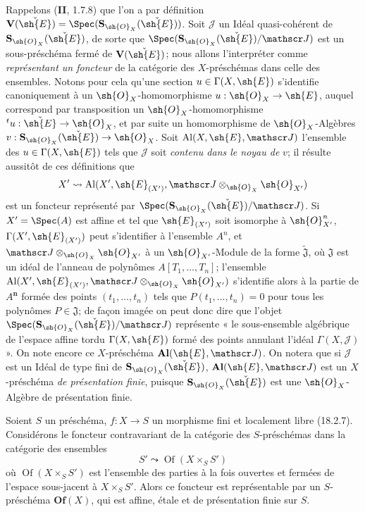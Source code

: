 \begin{env}[18.5.2]
\label{IV.18.5.2}
Rappelons (\textbf{II}, 1.7.8) que l'on a par définition $\mathbf V(\check{\sh{E}})=\Spec(\mathbf S_{\sh{O}_X}(\check{\sh{E}}))$. Soit $\mathscr J$ un Idéal quasi-cohérent de $\mathbf S_{\sh{O}_X}(\check{\sh{E}})$, de sorte que $\Spec(\mathbf S_{\sh{O}_X}(\check{\sh{E}})/\mathscr J)$ est un sous-préschéma fermé de $\mathbf V(\check{\sh{E}})$; nous allons l'interpréter comme \emph{représentant un foncteur} de la catégorie des $X$-préschémas dans celle des ensembles. Notons pour cela qu'une section $u\in\Gamma(X,\sh{E})$ s'identifie canoniquement à un $\sh{O}_X$-homomorphisme $u:\sh{O}_X\to\sh{E}$, auquel correspond par transposition un $\sh{O}_X$-homomorphisme ${}^t u:\check{\sh{E}}\to\sh{O}_X$, et par suite un homomorphisme de $\sh{O}_X$-Algèbres $v:\mathbf S_{\sh{O}_X}(\check{\sh{E}})\to\sh{O}_X$. Soit $\operatorname{Al}(X,\sh{E},\mathscr J)$ l'ensemble des $u\in\Gamma(X,\sh{E})$ tels que $\mathscr J$ soit \emph{contenu dans le noyau de} $v$; il résulte aussitôt de ces définitions que
\[
  X'\leadsto\operatorname{Al}(X',\sh{E}_{(X')},\mathscr J\otimes_{\sh{O}_X}\sh{O}_{X'})
\]
est un foncteur représenté par $\Spec(\mathbf S_{\sh{O}_X}(\check{\sh{E}})/\mathscr J)$. Si $X'=\Spec(A)$ est affine et tel que $\sh{E}_{(X')}$ soit isomorphe à $\sh{O}_{X'}^n$, $\Gamma(X',\sh{E}_{(X')})$ peut s'identifier à l'ensemble $A^n$, et $\mathscr J\otimes_{\sh{O}_X}\sh{O}_{X'}$ à un $\sh{O}_{X'}$-Module de la forme $\widetilde{\mathfrak J}$, où $\mathfrak J$ est un idéal de l'anneau de polynômes $A[T_1,\ldots,T_n]$; l'ensemble $\operatorname{Al}(X',\sh{E}_{(X')},\mathscr J\otimes_{\sh{O}_X}\sh{O}_{X'})$ s'identifie alors à la partie de $A^{\boldsymbol{n}}$ formée des points $(t_1,\ldots,t_n)$ tels que $P(t_1,\ldots,t_n)=0$ pour tous les polynômes $P\in\mathfrak J$; de façon imagée on peut donc dire que l'objet $\Spec(\mathbf S_{\sh{O}_X}(\check{\sh{E}})/\mathscr J)$ représente « le sous-ensemble algébrique de l'espace affine tordu $\Gamma(X,\sh{E})$ formé des points annulant l'idéal $\Gamma(X,\mathscr J)$ ». On note encore ce $X$-préschéma $\mathbf{Al}(\sh{E},\mathscr J)$. On notera que si $\mathscr J$ est un Idéal de type fini de $\mathbf S_{\sh{O}_X}(\check{\sh{E}})$, $\mathbf{Al}(\sh{E},\mathscr J)$ est un $X$-préschéma \emph{de présentation finie}, puisque $\mathbf S_{\sh{O}_X}(\check{\sh{E}})$ est une $\sh{O}_X$-Algèbre de présentation finie.
\end{env}

\begin{lemma}[18.5.3]
\label{IV.18.5.3}
Soient $S$ un préschéma, $f:X\to S$ un morphisme fini et localement libre \textup{(18.2.7)}. Considérons le foncteur contravariant de la catégorie des $S$-préschémas dans la catégorie des ensembles
\begin{equation}
  S'\leadsto\operatorname{Of}(X\times_S S')
  \tag{18.5.3.1}\label{IV.18.5.3.1}
\end{equation}
où $\operatorname{Of}(X\times_S S')$ est l'ensemble des parties à la fois ouvertes et fermées de l'espace sous-jacent à $X\times_S S'$. Alors ce foncteur est représentable par un $S$-préschéma $\mathbf{Of}(X)$, qui est affine, étale et de présentation finie sur $S$.
\end{lemma}


